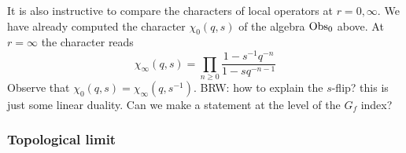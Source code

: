 \documentclass[11pt]{amsart}
\def\brian#1{{\textcolor{blue!65!red}{BRW: {#1}}}}
\begin{document}
It is also instructive to compare the characters of local operators at $r = 0, \infty$. 
We have already computed the character $\chi_0(q,s)$ of the algebra ${\rm Obs}_0$ above. 
At $r=\infty$ the character reads 
\[
\chi_\infty (q,s) = \prod_{n \geq 0} \frac{1 - s^{-1}q^{-n}}{1 - s q^{-n-1}}
\]
Observe that $\chi_0 (q,s) = \chi_\infty (q, s^{-1})$. 
\brian{how to explain the $s$-flip? this is just some linear duality. Can we make a statement at the level of the $G_f$ index?}

%
%
%
%
%

\subsubsection*{Topological limit}
\end{document}
